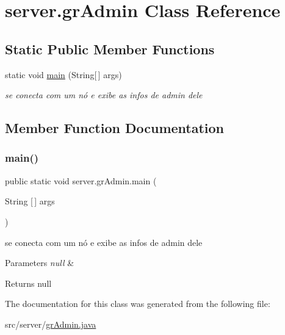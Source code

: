 \hypertarget{classserver_1_1gr_admin}{}\section{server.\+gr\+Admin Class Reference}
\label{classserver_1_1gr_admin}
\subsection*{Static Public Member Functions}
\begin{DoxyCompactItemize}
\item 
static void \hyperlink{classserver_1_1gr_admin_a4bde363e4e636eb9ef8e4ee55a1857d8}{main} (String\mbox{[}$\,$\mbox{]} args)
\begin{DoxyCompactList}\small\item\em se conecta com um nó e exibe as infos de admin dele \end{DoxyCompactList}\end{DoxyCompactItemize}


\subsection{Member Function Documentation}
\mbox{\label{classserver_1_1gr_admin_a4bde363e4e636eb9ef8e4ee55a1857d8}} 
\subsubsection{\texorpdfstring{main()}{main()}}
{\footnotesize\ttfamily public static void server.\+gr\+Admin.\+main (\begin{DoxyParamCaption}\item[{String \mbox{[}$\,$\mbox{]}}]{args }\end{DoxyParamCaption})\hspace{0.3cm}{\ttfamily [static]}}



se conecta com um nó e exibe as infos de admin dele 


\begin{DoxyParams}{Parameters}
{\em null} & \\
\hline
\end{DoxyParams}
\begin{DoxyReturn}{Returns}
null 
\end{DoxyReturn}


The documentation for this class was generated from the following file\+:\begin{DoxyCompactItemize}
\item 
src/server/\hyperlink{gr_admin_8java}{gr\+Admin.\+java}\end{DoxyCompactItemize}
